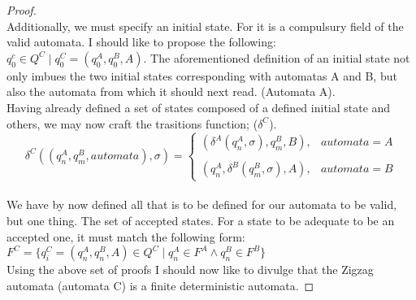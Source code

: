 \documentclass{article}
\begin{document}
\begin{proof}
\\
Additionally, we must specify an initial state. For it is a compulsury field of the valid automata. I should like to propose the following: \newline
$q_0^{c} \in Q^{C} \mid q_0^{C} = (q_0^{A}, q_0^{B}, A)$. \newline
The aforementioned definition of an initial state not only imbues the two initial states corresponding with automatas A and B, but also the automata from which it should next read. (Automata A). \newline
\\
Having already defined a set of states composed of a defined initial state and others, we may now craft the trasitions function; ($\delta^{C}$). \newline
\[
  \delta^{C} ((q_n^{A}, q_m^{B}, automata), \sigma) =
  \begin{cases}
    (\delta^{A}(q_n^{A}, \sigma), q_m^{B}, B), & automata = A\\\\
    (q_n^{A}, \delta^{B}(q_m^{B}, \sigma), A), & automata = B
  \end{cases}
\]
\\
We have by now defined all that is to be defined for our automata to be valid, but one thing. The set of accepted states. For a state to be adequate to be an accepted one, it must match the following form: \newline
$F^{C} = \{q_i^{C} = (q_n^{A}, q_n^{B}, A) \in Q^{C} \mid q_n^{A} \in F^{A} \wedge q_n^{B} \in F^{B}\}$ \newline
\\
Using the above set of proofs I should now like to divulge that the Zigzag automata (automata C) is a finite deterministic automata.
\end{proof}
\end{document}
